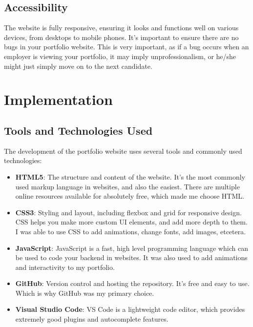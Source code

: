 \documentclass[15pt]{report}
\begin{document}
\section{Accessibility}
The website is fully responsive, ensuring it looks and functions well on various devices, from desktops to mobile phones. It's important to ensure there are no bugs in your portfolio website. This is very important, as if a bug occurs when an employer is viewing your portfolio, it may imply unprofessionalism, or he/she might just simply move on to the next candidate. 

\chapter{Implementation}
\section{Tools and Technologies Used}
The development of the portfolio website uses several tools and commonly used technologies:
\begin{itemize}
    \item \textbf{HTML5}: The structure and content of the website. It's the most commonly used markup language in websites, and also the easiest. There are multiple online resources available for absolutely free, which made me choose HTML. 
    \item \textbf{CSS3}: Styling and layout, including flexbox and grid for responsive design. CSS helps you make more custom UI elements, and add more depth to them. I was able to use CSS to add animations, change fonts, add images, etcetera. 
    \item \textbf{JavaScript}: JavaScript is a fast, high level programming language which can be used to code your backend in websites. It was also used to add animations and interactivity to my portfolio.
    \item \textbf{GitHub}: Version control and hosting the repository. It's free and easy to use. Which is why GitHub was my primary choice.
    \item \textbf{Visual Studio Code}: VS Code is a lightweight code editor, which provides extremely good plugins and autocomplete features. 
\end{itemize}
\end{document}
